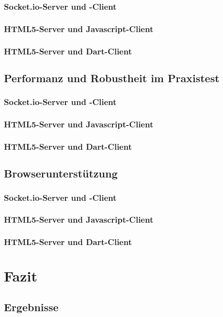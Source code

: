 \subsection{Socket.io-Server und -Client}
\subsection{HTML5-Server und Javascript-Client}
\subsection{HTML5-Server und Dart-Client}
\section{Performanz und Robustheit im Praxistest}
\subsection{Socket.io-Server und -Client}
\subsection{HTML5-Server und Javascript-Client}
\subsection{HTML5-Server und Dart-Client}
\section{Browserunterstützung}
\subsection{Socket.io-Server und -Client}
\subsection{HTML5-Server und Javascript-Client}
\subsection{HTML5-Server und Dart-Client}

\chapter{Fazit}\label{c.Fazit}
 \section{Ergebnisse }
